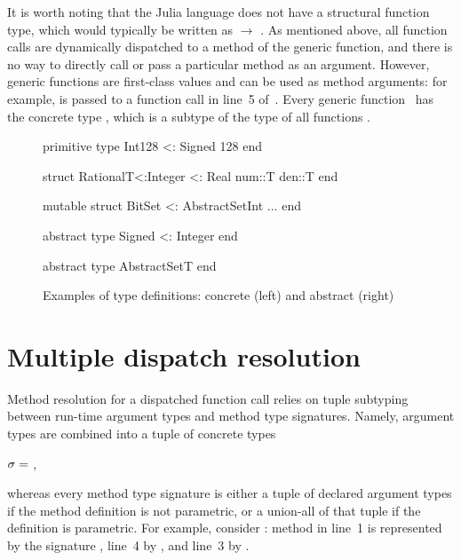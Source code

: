 It is worth noting that the Julia language does not have a structural function type,
which would typically be written as  $\rightarrow$ . As mentioned above,
all function calls are dynamically dispatched to a method of the generic
function, and there is no way to directly call or
pass a particular method as an argument.
However, generic functions are first-class values and can be used as
method arguments: for example, \cjl{(-)} is passed to a function call in line~5
of~.
Every generic function~ has the concrete type ,
which is a subtype of the type of all functions .

\begin{figure}[t] 
\begin{minipage}{6cm}
\begin{julia}
primitive type Int128 <: Signed 128
end

struct Rational{T<:Integer} <: Real
  num::T
  den::T
end

mutable struct
  BitSet <: AbstractSet{Int}
  ...
end
\end{julia}
\end{minipage}
\hspace{1.2cm}
\begin{minipage}{5.5cm}
\begin{julia}
abstract type Signed <: Integer
end

abstract type AbstractSet{T}
end
\end{julia}
\end{minipage}
\caption{Examples of type definitions:
  concrete (left) and abstract (right)}\label{fig:code:user-def-types}
\end{figure}


\section{Multiple dispatch resolution}\label{sec:2:dispatch}

Method resolution for a dispatched function call 
relies on tuple subtyping~\cite{leavens:tuple-dispatch:1998}
between run-time argument types and method type signatures.
Namely, argument types are combined into a tuple of concrete types
\begin{center}
  $\sigma =$ ,
\end{center}
whereas every method type signature is either a tuple of declared argument types
if the method definition is not parametric, or a union-all of that tuple
if the definition is parametric.
For example, consider : method in line~1
is represented by the signature , line~4 by
, and line~3 by
.

